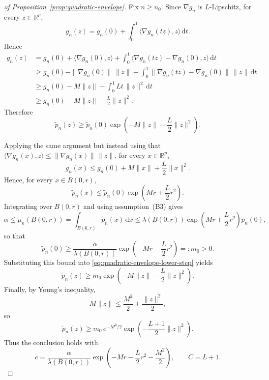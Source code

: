 \documentclass[11pt]{article}
\theoremstyle{plain}
\theoremstyle{definition}
\theoremstyle{remark}
\begin{document}
\begin{proof}[of Proposition~\ref{prop:quadratic-envelope}] Fix $n\ge n_{0}$.
Since $\nabla g_{n}$ is $L$-Lipschitz, for every $z\in\mathbb{R}^{p}$,
\[
g_{n}(z)=g_{n}(0)+\int_{0}^{1}\langle\nabla g_{n}(tz),z\rangle\,\mathrm{d}t.
\]
Hence
\[
\begin{aligned}g_{n}(z) & =g_{n}(0)+\langle\nabla g_{n}(0),z\rangle+\int_{0}^{1}\langle\nabla g_{n}(tz)-\nabla g_{n}(0),z\rangle\,\mathrm{d}t\\
 & \ge g_{n}(0) - \|\nabla g_n(0)\|\, \|z\| -\int_{0}^{1}\|\nabla g_{n}(tz)-\nabla g_{n}(0)\|\,\|z\|\,\mathrm{d}t\\
 & \ge g_{n}(0)-M\|z\|-\int_{0}^{1}Lt\,\|z\|^{2}\,\mathrm{d}t\\
 & \ge g_{n}(0)-M\|z\|-\frac{L}{2}\|z\|^{2}.
\end{aligned}
\]
Therefore
\begin{equation}
\tilde p_{n}(z)\ge \tilde p_{n}(0)\exp\left(-M\|z\|-\frac{L}{2}\|z\|^{2}\right).\label{eq:quadratic-envelope-lower-step}
\end{equation}

Applying the same argument but instead using that $\langle\nabla g_{n}(x),z\rangle \leq \|\nabla g_n(x)\|\,\|z\|$, for every $x\in\mathbb{R}^{p}$,
\[
g_{n}(x)\le g_{n}(0)+M\|x\|+\frac{L}{2}\|x\|^{2}.
\]
Hence, for every $x\in B(0,r)$,
\[
\tilde p_{n}(x)\le \tilde p_{n}(0)\exp\left(Mr+\frac{L}{2}r^{2}\right).
\]
Integrating over $B(0,r)$ and using assumption~(B3)
gives
\[
\alpha\le\tilde\mu_{n}(B(0,r))=\int_{B(0,r)}\tilde p_{n}(x)\,\mathrm{d}x\le\lambda\left(B(0,r)\right)\exp\left(Mr+\frac{L}{2}r^{2}\right)\tilde p_{n}(0),
\]
so that
\[
\tilde p_{n}(0)\ge\frac{\alpha}{\lambda\left(B(0,r)\right)}\exp\left(-Mr-\frac{L}{2}r^{2}\right)=:m_{0}>0.
\]
Substituting this bound into \eqref{eq:quadratic-envelope-lower-step}
yields
\[
\tilde p_{n}(z)\ge m_{0}\exp\left(-M\|z\|-\frac{L}{2}\|z\|^{2}\right).
\]
Finally, by Young's inequality,
\[
M\|z\|\le\frac{M^{2}}{2}+\frac{\|z\|^{2}}{2},
\]
so
\[
\tilde p_{n}(z)\ge m_{0}\,e^{-M^{2}/2}\exp\left(-\frac{L+1}{2}\|z\|^{2}\right).
\]
Thus the conclusion holds with
\[
c=\frac{\alpha}{\lambda\left(B(0,r)\right)}\exp\left(-Mr-\frac{L}{2}r^{2}-\frac{M^{2}}{2}\right),\qquad C=L+1.
\]
\end{proof}
\end{document}
